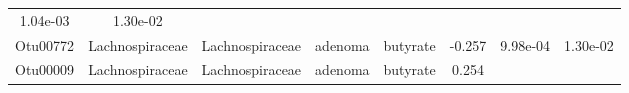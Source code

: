 \documentclass[11pt,]{article}
\begin{document}
\begin{longtable}[]{@{}cccccccc@{}}
\begin{minipage}[t]{0.08\columnwidth}
1.04e-03\strut
\end{minipage} & \begin{minipage}[t]{0.08\columnwidth}\centering\strut
1.30e-02\strut
\end{minipage}\tabularnewline
\begin{minipage}[t]{0.08\columnwidth}\centering\strut
Otu00772\strut
\end{minipage} & \begin{minipage}[t]{0.15\columnwidth}\centering\strut
Lachnospiraceae\strut
\end{minipage} & \begin{minipage}[t]{0.15\columnwidth}\centering\strut
Lachnospiraceae\strut
\end{minipage} & \begin{minipage}[t]{0.08\columnwidth}\centering\strut
adenoma\strut
\end{minipage} & \begin{minipage}[t]{0.09\columnwidth}\centering\strut
butyrate\strut
\end{minipage} & \begin{minipage}[t]{0.07\columnwidth}\centering\strut
-0.257\strut
\end{minipage} & \begin{minipage}[t]{0.08\columnwidth}\centering\strut
9.98e-04\strut
\end{minipage} & \begin{minipage}[t]{0.08\columnwidth}\centering\strut
1.30e-02\strut
\end{minipage}\tabularnewline
\begin{minipage}[t]{0.08\columnwidth}\centering\strut
Otu00009\strut
\end{minipage} & \begin{minipage}[t]{0.15\columnwidth}\centering\strut
Lachnospiraceae\strut
\end{minipage} & \begin{minipage}[t]{0.15\columnwidth}\centering\strut
Lachnospiraceae\strut
\end{minipage} & \begin{minipage}[t]{0.08\columnwidth}\centering\strut
adenoma\strut
\end{minipage} & \begin{minipage}[t]{0.09\columnwidth}\centering\strut
butyrate\strut
\end{minipage} & \begin{minipage}[t]{0.07\columnwidth}\centering\strut
0.254\strut
\end{minipage} & \begin{minipage}[t]{0.08\columnwidth}\centering\strut

\end{minipage}
\end{longtable}
\end{document}
